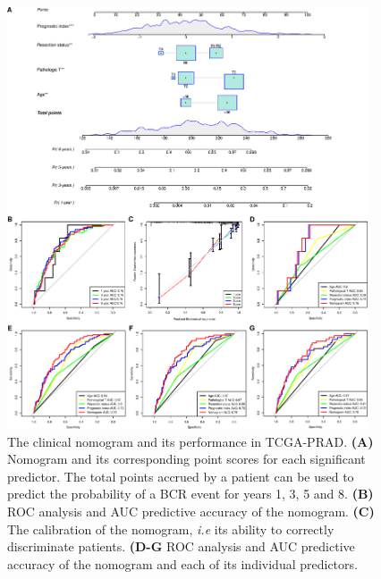 \documentclass[twocolumn]{bmcart}%
\begin{document}
\begin{figure}[h!]
    \includegraphics[width=0.95\textwidth]{figures/Clinical_Plots.png}
    \caption{The clinical nomogram and its performance in TCGA-PRAD. \textbf{(A)} Nomogram and its corresponding point scores for each significant predictor. The total points accrued by a patient can be used to predict the probability of a BCR event for years 1, 3, 5 and 8. \textbf{(B)} ROC analysis and AUC predictive accuracy of the nomogram. \textbf{(C)} The calibration of the nomogram, \textit{i.e} its ability to correctly discriminate patients. \textbf{(D-G} ROC analysis and AUC predictive accuracy of the nomogram and each of its individual predictors.}
    \label{fig:clinical_data}
\end{figure}
\end{document}

